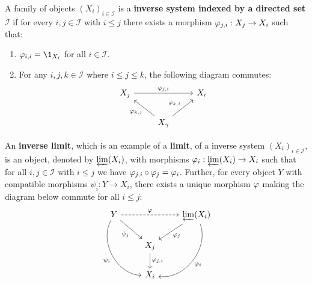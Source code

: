 \documentclass{ximera}
\begin{document}
\begin{definition}
  A family of objects $(X_i)_{i\in \mathcal{I}}$ is a \textbf{inverse
    system indexed by a directed set $\boldsymbol{\mathcal{I}}$} if
  for every $i,j \in \mathcal{I}$ with $i \le j$ there exists a
  morphism $\varphi_{j,i}:X_j \to X_ i$ such that:
  \begin{enumerate}
  \item $\ph_{i,i} = \1_{X_i}$ for all $i \in \mathcal{I}$.
  \item For any $i,j,k \in \mathcal{I}$ where $i\le j\le k$, the
    following diagram commutes:
    \[
    \begin{tikzcd}
      X_j \ar[rr,"\ph_{j,i}"] &    & X_i\\
      &  X_\gamma\ar[ul,"\ph_{k,j}"] \ar[ur,"\ph_{k,i}"]  &
    \end{tikzcd}
    \]
  \end{enumerate}
\end{definition}


\begin{definition}
  An \textbf{inverse limit}, which is an example of a \textbf{limit},
  of a inverse system $(X_i)_{i\in \mathcal{I}}$, is an
  object, denoted by $\varprojlim(X_i)$, with morphisms
  $\varphi_i:\varprojlim(X_i)\to X_i$ such that for all
  $i, j \in \mathcal{I}$ with $i \le j$ we have
  $\varphi_{j,i} \circ \varphi_j = \varphi_i$.  Further, for
  every object $Y$ with compatible morphisms $\psi_i:Y\to
  X_i$, there exists a unique morphism $\varphi$ making the diagram
  below commute for all $i\le j$:
\[
\begin{tikzcd}
  Y\ar[ddr,bend right=60,swap,"\psi_i"] \ar[dr,swap,"\psi_j"]  \ar[dashed,rr,"\ph"] &   &  \invlim(X_{i}) \ar[ddl,bend left=60,"\ph_i"] \ar[dl,"\ph_j"]\\
  & X_{j} \ar[d,"\ph_{j,i}"] &\\
  & X_{i}&
\end{tikzcd}
\]
\end{definition}
\end{document}
